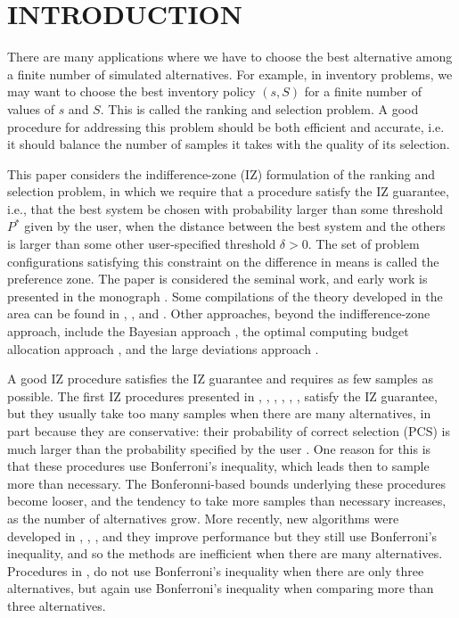 \documentclass{wscpaperproc}
\theoremstyle{wsc}
\begin{document}
\section{INTRODUCTION}
\label{sec:intro}


There are many applications where we have to choose the best alternative
among a finite number of simulated alternatives. For example, in inventory problems, we may want to choose the best inventory policy $(s,S)$ for a finite number of values of $s$ and $S$. 
This is called the ranking and selection problem.
A good procedure for addressing this problem should be both efficient and accurate, i.e. it should balance the number of samples it takes with the quality of its selection.

This paper considers the indifference-zone (IZ) formulation of the ranking and selection problem, in which we require that a procedure satisfy the IZ guarantee, i.e., that the best system be chosen with probability larger than some threshold $P^*$ given by the user, when the distance between the best system and the others is larger than some other user-specified threshold $\delta>0$.  The set of problem configurations satisfying this constraint on the difference in means is called the preference zone.
The paper  is considered the seminal work, and early work is 
presented in the monograph . Some compilations of the theory developed in the area can be found
in , ,  and . Other approaches, beyond the indifference-zone approach, include the Bayesian approach \cite{Frazier:Tutorial}, the optimal computing budget allocation approach \cite{chen:ocva}, and the large deviations approach \cite{glynn2004large}.

A good IZ procedure satisfies the IZ guarantee and requires as few samples as possible.
The first IZ procedures presented in , , , ,
, ,  
satisfy the IZ guarantee, but they usually take too many samples when there are many alternatives,
in part because they are conservative: their probability of correct selection (PCS) is much
larger than the probability specified by the user \cite{Kim:Conserv}. One reason for this
is that these procedures use Bonferroni's inequality, which leads then to sample more
than necessary. The Bonferonni-based bounds underlying these procedures become looser, and the tendency to take more samples than necessary increases, as the number of alternatives grow.
More recently, new algorithms were developed in , , 
, and they improve performance but they still
use Bonferroni's inequality, and so the methods are inefficient
when there are many alternatives. Procedures in ,
 do not use Bonferroni's inequality 
when there are only three alternatives, but again use Bonferroni's inequality when 
comparing more than three alternatives.
\end{document}

